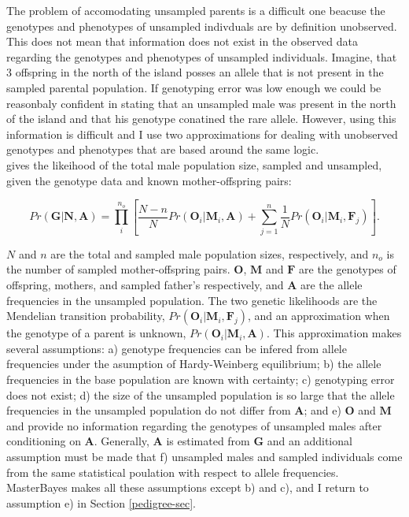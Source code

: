 \documentclass{article}
\begin{document}
The problem of accomodating unsampled parents is a difficult one beacuse the genotypes and phenotypes of unsampled indivduals are by definition unobserved. This does not mean that information does not exist in the observed data regarding the genotypes and phenotypes of unsampled individuals.  Imagine, that 3 offspring in the north of the island posses an allele that is not present in the sampled parental population. If genotyping error was low enough we could be reasonbaly confident in stating that an unsampled male was present in the north of the island and that his genotype conatined the rare allele.  However, using this information is difficult and I use two approximations for dealing with unobserved genotypes and phenotypes that are based around the same logic.\\

\citet{Nielsen.2001} gives the likeihood of the total male population size, sampled and unsampled, given the genotype data and known mother-offspring pairs:

\begin{equation} 
Pr(\bm{G}|\bm{N}, \bm{A}) = \prod^{n_{o}}_{i}\left[\frac{N-n}{N}Pr(\bm{O}_{i}|\bm{M}_{i}, \bm{A}) + \sum_{j=1}^{n}\frac{1}{N}Pr(\bm{O}_{i}|\bm{M}_{i}, \bm{F}_{j})\right].
\label{Nielsen-eq}
\end{equation} 

$N$ and $n$ are the total and sampled male population sizes, respectively, and $n_{o}$ is the number of sampled mother-offspring pairs.  $\bm{O}$, $\bm{M}$ and $\bm{F}$ are the genotypes of offspring, mothers, and sampled father's respectively, and $\bm{A}$ are the allele frequencies in the unsampled population. The two genetic likelihoods are the Mendelian transition probability, $Pr(\bm{O}_{i}|\bm{M}_{i}, \bm{F}_{j})$, and an approximation when the genotype of a parent is unknown, $Pr(\bm{O}_{i}|\bm{M}_{i}, \bm{A})$.  This approximation makes several assumptions: a) genotype frequencies can be infered from allele frequencies under the asumption of Hardy-Weinberg equilibrium; b) the allele frequencies in the base population are known with certainty; c) genotyping error does not exist; d) the size of the unsampled population is so large that the allele frequencies in the unsampled population do not differ from $\bm{A}$; and e) $\bm{O}$ and $\bm{M}$ and provide no information regarding the genotypes of unsampled males after conditioning on $\bm{A}$. Generally, $\bm{A}$ is estimated from $\bm{G}$ and an additional assumption must be made that f) unsampled males and sampled individuals come from the same statistical poulation with respect to allele frequencies.  MasterBayes makes all these assumptions except b) and c), and I return to assumption e) in Section \ref{pedigree-sec}.\\ 
\end{document}
